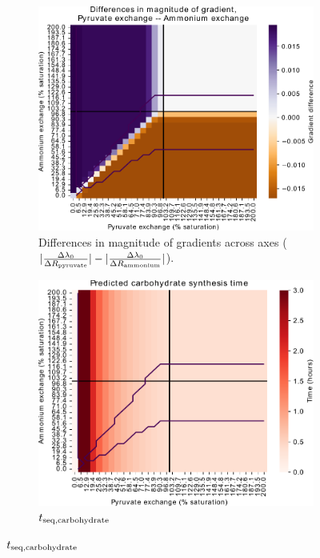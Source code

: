 \begin{figure}
  \begin{subfigure}[t]{0.45\textwidth}
  \centering
    \includegraphics[width=\linewidth]{ec_grid_pyr_amm_gradient_compare}
    \caption{
      Differences in magnitude of gradients across axes ($|\frac{\Delta \lambda_{0}}{\Delta R_{\mathrm{pyruvate}}}| - |\frac{\Delta \lambda_{0}}{\Delta R_{\mathrm{ammonium}}}|$).
    }
    \label{fig:model-grid-pyr-gradient-compare}
  \end{subfigure}%
  \begin{subfigure}[t]{0.45\textwidth}
  \centering
    \includegraphics[width=\linewidth]{ec_grid_pyr_amm_carb}
    \caption{
      $t_{\mathrm{seq},\mathrm{carbohydrate}}$
    }
    \label{fig:model-grid-pyr-carb}
  \end{subfigure}


\end{figure}
